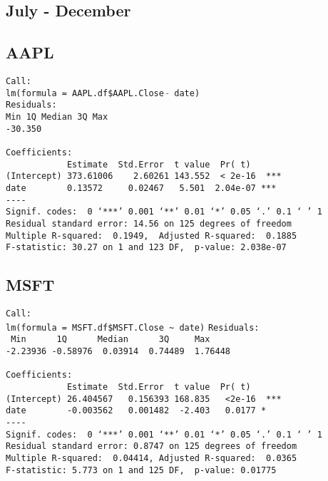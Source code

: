 \documentclass{article}[14pt]
\begin{document}
\subsection{July - December}
\subsection{AAPL}
\texttt{Call: \\
lm(formula = AAPL.df\$AAPL.Close $\tilde{}$ date)\\
Residuals:\\
Min \hspace{35pt} 1Q \qquad Median \qquad 3Q \qquad  Max\\
-30.350        \\}
\verb| |\\
\verb|Coefficients:|\\
\verb|            Estimate  Std.Error  t value  Pr( t)|\\
\verb|(Intercept) 373.61006    2.60261 143.552  < 2e-16  ***|\\
\verb|date        0.13572     0.02467   5.501  2.04e-07 ***|\\
\verb|----|\\
\verb|Signif. codes:  0 ‘***’ 0.001 ‘**’ 0.01 ‘*’ 0.05 ‘.’ 0.1 ‘ ’ 1|\\
\verb|Residual standard error: 14.56 on 125 degrees of freedom|\\
\verb|Multiple R-squared:  0.1949,	Adjusted R-squared:  0.1885|\\
\verb|F-statistic: 30.27 on 1 and 123 DF,  p-value: 2.038e-07|
\subsection{MSFT}
\verb|Call:|\\
\verb|lm(formula = MSFT.df$MSFT.Close ~ date)|
\verb|Residuals:|\\
\verb| Min      1Q      Median      3Q     Max |\\
\verb|-2.23936 -0.58976  0.03914  0.74489  1.76448  |\\
\verb| |\\
\verb|Coefficients:|\\
\verb|            Estimate  Std.Error  t value  Pr( t)|\\
\verb|(Intercept) 26.404567   0.156393 168.835   <2e-16  ***|\\
\verb|date        -0.003562   0.001482  -2.403   0.0177 * |\\
\verb|----|\\
\verb|Signif. codes:  0 ‘***’ 0.001 ‘**’ 0.01 ‘*’ 0.05 ‘.’ 0.1 ‘ ’ 1|\\
\verb|Residual standard error: 0.8747 on 125 degrees of freedom|\\
\verb|Multiple R-squared:  0.04414,	Adjusted R-squared:  0.0365|\\
\verb|F-statistic: 5.773 on 1 and 125 DF,  p-value: 0.01775|
\end{document}
